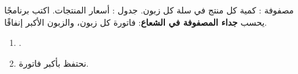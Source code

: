\begin{statement}
مصفوفة : كمية كل منتج في سلة كل زبون. جدول : أسعار المنتجات. اكتب برنامجًا يحسب \textbf{جداء المصفوفة في الشعاع}: فاتورة كل زبون، والزبون الأكبر إنفاقًا.
\end{statement}
\begin{stepsbox}\begin{enumerate}
\item \par{\centering\small{}\par}.
\item نحتفظ بأكبر فاتورة.
\end{enumerate}\end{stepsbox}
